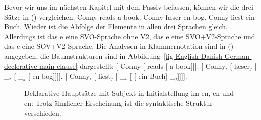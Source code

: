 Bevor wir uns im nächsten Kapitel mit dem Passiv befassen, können wir die drei Sätze in () vergleichen:
\eal
\ex Conny reads a book.
\ex Conny læser en bog.
\ex Conny liest ein Buch.
\zl
Wieder ist die Abfolge der Elemente in allen drei Sprachen gleich. Allerdings ist das e eine SVO-Sprache
ohne V2, das e eine SVO+V2-Sprache und das e eine SOV+V2-Sprache. Die Analysen in
Klammernotation sind in () angegeben, die Baumstrukturen sind in Abbildung~\vref{fig-English-Danish-German-declerative-main-clause} dargestellt:
\eal
\ex {}[ Conny [ reads [ a book]]].
\ex {}[ Conny$_i$ [ læser$_j$ [ \_$_i$ [  \_$_j$ [ en bog]]]].
\ex {}[ Conny$_i$ [ liest$_j$ [ \_$_i$ [\sub{\vbar} [ ein Buch] \_$_j$]]]].
\zl
\begin{figure}
\hfill
{}
\hfill
{}
\caption{\label{fig-English-Danish-German-declerative-main-clause}Deklarative Hauptsätze mit
  Subjekt in Initialstellung im en, en und en: Trotz ähnlicher Erscheinung ist die
  syntaktische Struktur verschieden.}
\end{figure}

